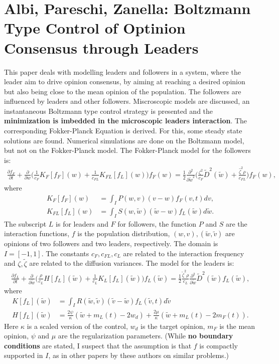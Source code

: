 \documentclass[11pt, a4paper]{article}
\theoremstyle{definition}
\begin{document}
\section{Albi, Pareschi, Zanella: Boltzmann Type Control of Optinion Consensus through Leaders \cite{Albi_2014no1}}
This paper deals with modelling leaders and followers in a system, where the leader aim to drive opinion consensus, by aiming at reaching a desired opinion but also being close to the mean opinion of the population. The followers are influenced by leaders and other followers. Miscroscopic models are discussed, an instantaneous Boltzmann type control strategy is presented and the \textbf{minimization is imbedded in the microscopic leaders interaction}. The corresponding Fokker-Planck Equation is derived. For this, some steady state solutions are found. Numerical simulations are done on the Boltzmann model, but not on the Fokker-Planck model.
The Fokker-Planck model for the followers is:
\begin{align*}
\frac{\partial f_F}{\partial t}  + \frac{\partial}{\partial w}\bigg( \frac{1}{c_F}K_F[f_F](w) + \frac{1}{c_{FL}}K_{FL}[f_L](w)\bigg)f_F(w)= \frac{1}{2} \frac{\partial^2}{\partial \tilde w^2} \bigg( \frac{\zeta^2}{c_F} \tilde D^2 (\tilde w) + \frac{\hat \zeta^2 \rho}{c_{FL}}\bigg)f_F(w),
\end{align*}
where
\begin{align*}
K_F[f_F](w) &=\int_I P(w,v)(v-w) f_F(v,t)dv,\\
K_{FL}[f_L](w) &= \int_I S(w, \tilde w)(\tilde w - w)f_L(\tilde w)d \tilde w.
\end{align*}
The subscript $L$ is for leaders and $F$ for followers, the function $P$ and $S$ are the interaction functions, $f$ is the population distribution, $(w,v), (\tilde w, \tilde v)$ are opinions of two followers and two leaders, respectively. The domain is $I=[-1,1]$. The constants $c_F, c_{FL}, c_L$ are related to the interaction frequency and $\zeta, \tilde \zeta$ are related to the diffusion variances.
The model for the leaders is:
\begin{align*}
\frac{\partial f_L}{\partial t} + \frac{\partial}{\partial \tilde w} \bigg( \frac{\rho}{c_L} H[f_L](\tilde w) + \frac{1}{c_L}K_L[f_L](\tilde w)\bigg)f_L(\tilde w) = \frac{1}{2} \frac{\tilde \zeta ^2 \rho}{c_L}\frac{\partial^2}{\partial \tilde w} \tilde D^2(\tilde w) f_L(\tilde w),
\end{align*}
where
\begin{align*}
K[f_L](\tilde w) &= \int_I R(\tilde w , \tilde v)( \tilde v - \tilde w)f_L(\tilde v,t)d \tilde v\\
H[f_L](\tilde w ) &= \frac{2\psi}{\kappa}(\tilde w + m_L(t) - 2w_d) + \frac{2 \mu}{\kappa}(\tilde w + m_L(t) -2m_F(t)).
\end{align*}
Here $\kappa$ is a scaled version of the control, $w_d$ is the target opinion, $m_F$ is the mean opinion, $\psi$ and $\mu$ are the regularization parameters.
(While \textbf{no boundary conditions} are stated, I suspect that the assumption is that $f$ is compactly supported in $I$, as in other papers by these authors on similar problems.)
\end{document}
